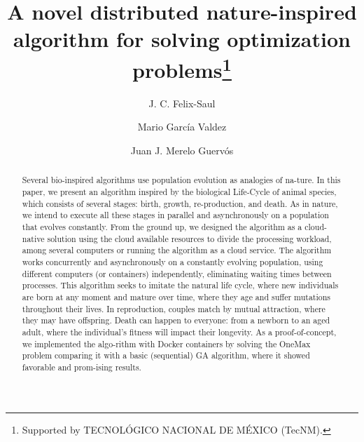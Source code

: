 \documentclass[runningheads]{llncs}
\begin{document}
%
\title{A novel distributed nature-inspired algorithm for solving optimization problems\thanks{Supported by TECNOLÓGICO NACIONAL DE MÉXICO (TecNM).}}
%
%
\author{J. C. Felix-Saul  \and
Mario García Valdez \and
Juan J. Merelo Guervós}
%
%
%
\maketitle              %
%
\begin{abstract}

Several bio-inspired algorithms use population evolution as analogies of
na-ture. In this paper, we present an algorithm inspired by the biological
Life-Cycle of animal species, which consists of several stages: birth, growth,
re-production, and death. As in nature, we intend to execute all these stages
in parallel and asynchronously on a population that evolves constantly. From
the ground up, we designed the algorithm as a cloud-native solution using the
cloud available resources to divide the processing workload, among several
computers or running the algorithm as a cloud service. The algorithm works
concurrently and asynchronously on a constantly evolving population, using
different computers (or containers) independently, eliminating waiting times
between processes. This algorithm seeks to imitate the natural life cycle,
where new individuals are born at any moment and mature over time, where they
age and suffer mutations throughout their lives. In reproduction, couples match
by mutual attraction, where they may have offspring. Death can happen to
everyone: from a newborn to an aged adult, where the individual's fitness will
impact their longevity. As a proof-of-concept, we implemented the algo-rithm
with Docker containers by solving the OneMax problem comparing it with a basic
(sequential) GA algorithm, where it showed favorable and prom-ising results.

\end{abstract}
\end{document}
